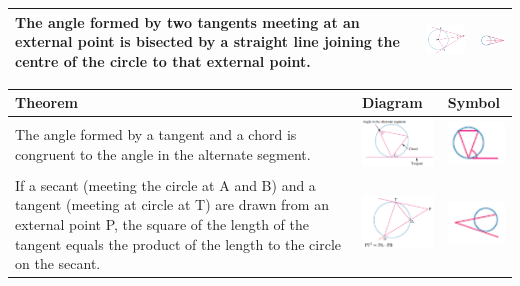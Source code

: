 \documentclass[a4paper,10pt]{report}
\begin{document}
\begin{center}
\begin{tabular}[center]{|p{5cm}|p{3cm}|p{2cm}|}
		The angle formed by two tangents meeting at an external point is bisected by a straight line joining the centre of the circle to that external point.                                          & \includegraphics[width=3cm]{circle theorem 10} & \includegraphics[width=2cm]{circle theorem 10 symbol} \\ \hline
	\end{tabular}
	\begin{tabular}[center]{|p{5cm}|p{3cm}|p{2cm}|}
		\hline
		Theorem                                                                                                                                                                                                                      & Diagram                                        & Symbol                                                \\ \hline
		The angle formed by a tangent and a chord is congruent to the angle in the alternate segment.                                                                                                                                & \includegraphics[width=3cm]{circle theorem 11} & \includegraphics[width=2cm]{circle theorem 11 symbol} \\ \hline
		If a secant (meeting the circle at A and B) and a tangent (meeting at circle at T) are drawn from an external point P, the square of the length of the tangent equals the product of the length to the circle on the secant. & \includegraphics[width=3cm]{circle theorem 12} & \includegraphics[width=2cm]{circle theorem 12 symbol} \\ \hline

\end{tabular}
\end{center}
\end{document}
